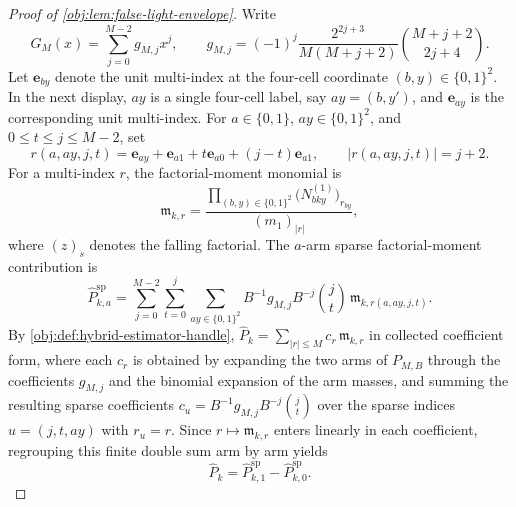 \documentclass[11pt]{article}
\begin{document}
\begin{proof}[Proof of \cref{obj:lem:false-light-envelope}]
Write
\[
G_M(x)=\sum_{j=0}^{M-2}g_{M,j}x^j,
\qquad
 g_{M,j}=(-1)^j
 \frac{2^{2j+3}}{M(M+j+2)}\binom{M+j+2}{2j+4}.
\]
Let \(\mathbf e_{by}\) denote the unit multi-index at the four-cell coordinate \((b,y)\in\{0,1\}^2\).  In the next display, \(ay\) is a single four-cell label, say \(ay=(b,y')\), and \(\mathbf e_{ay}\) is the corresponding unit multi-index.  For \(a\in\{0,1\}\), \(ay\in\{0,1\}^2\), and \(0\le t\le j\le M-2\), set
\[
r(a,ay,j,t)
=
\mathbf e_{ay}+\mathbf e_{a1}+t\mathbf e_{a0}+(j-t)\mathbf e_{a1},
\qquad |r(a,ay,j,t)|=j+2.
\]
For a multi-index \(r\), the factorial-moment monomial is
\[
\mathfrak m_{k,r}
=
\frac{\prod_{(b,y)\in\{0,1\}^2}
\bigl(N^{(1)}_{bky}\bigr)_{r_{by}}}
{(m_1)_{|r|}},
\]
where \((z)_s\) denotes the falling factorial.  The \(a\)-arm sparse factorial-moment contribution is
\[
\widehat P_{k,a}^{\mathrm{sp}}
=
\sum_{j=0}^{M-2}\sum_{t=0}^j\sum_{ay\in\{0,1\}^2}
B^{-1}g_{M,j}B^{-j}\binom jt\,
\mathfrak m_{k,r(a,ay,j,t)}.
\]
By \cref{obj:def:hybrid-estimator-handle}, \(\widehat P_k=\sum_{|r|\le M}c_r\,\mathfrak m_{k,r}\) in collected coefficient form, where each \(c_r\) is obtained by expanding the two arms of \(P_{M,B}\) through the coefficients \(g_{M,j}\) and the binomial expansion of the arm masses, and summing the resulting sparse coefficients \(c_u=B^{-1}g_{M,j}B^{-j}\binom jt\) over the sparse indices \(u=(j,t,ay)\) with \(r_u=r\).  Since \(r\mapsto\mathfrak m_{k,r}\) enters linearly in each coefficient, regrouping this finite double sum arm by arm yields
\[
\widehat P_k=\widehat P_{k,1}^{\mathrm{sp}}-
\widehat P_{k,0}^{\mathrm{sp}} .
\]


\end{proof}
\end{document}
